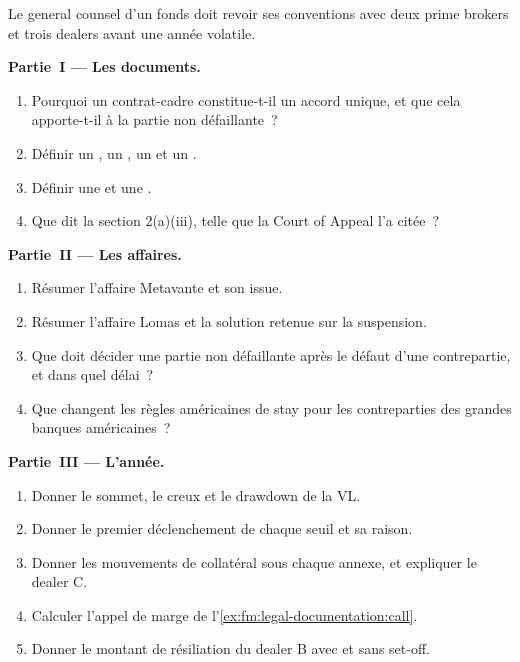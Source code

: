\begin{problem}\label{pb:fm:legal-documentation:1}
Le general counsel d'un fonds doit revoir ses conventions avec deux prime brokers et trois dealers avant une année volatile.

\medskip\noindent\textbf{Partie~I --- Les documents.}
\begin{enumerate}
\item Pourquoi un contrat-cadre constitue-t-il un accord unique, et que cela apporte-t-il à la partie non défaillante~?
\item Définir un , un , un  et un .
\item Définir une  et une .
\item Que dit la section 2(a)(iii), telle que la Court of Appeal l'a citée~?
\end{enumerate}

\medskip\noindent\textbf{Partie~II --- Les affaires.}
\begin{enumerate}[resume]
\item Résumer l'affaire Metavante et son issue.
\item Résumer l'affaire Lomas et la solution retenue sur la suspension.
\item Que doit décider une partie non défaillante après le défaut d'une contrepartie, et dans quel délai~?
\item Que changent les règles américaines de stay pour les contreparties des grandes banques américaines~?
\end{enumerate}

\medskip\noindent\textbf{Partie~III --- L'année.}
\begin{enumerate}[resume]
\item Donner le sommet, le creux et le drawdown de la VL.
\item Donner le premier déclenchement de chaque seuil et sa raison.
\item Donner les mouvements de collatéral sous chaque annexe, et expliquer le dealer C.
\item Calculer l'appel de marge de l'\cref{ex:fm:legal-documentation:call}.
\item Donner le montant de résiliation du dealer B avec et sans set-off.
\end{enumerate}


\end{problem}
